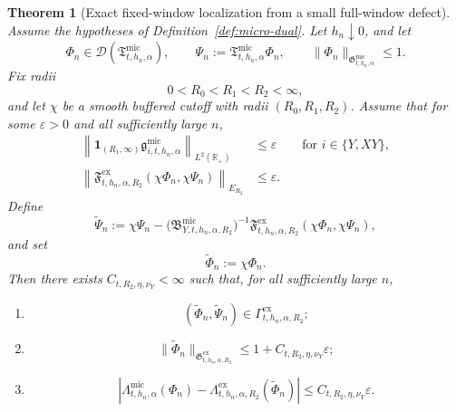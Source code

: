 \documentclass[11pt,a4paper]{amsart}
\theoremstyle{plain}
\newtheorem{theorem}{Theorem}[section]
\theoremstyle{definition}
\theoremstyle{remark}
\newcommand{\R}{\mathbb{R}}
\newcommand{\one}{\mathbf 1}
\begin{document}
\begin{theorem}[Exact fixed-window localization from a small full-window defect]
\label{thm:defect-localization}
Assume the hypotheses of Definition~\ref{def:micro-dual}. Let \(h_n\downarrow0\), and let
\[
\Phi_n\in\mathcal D(\mathfrak T_{t,h_n,\alpha}^{\mathrm{mic}}),
\qquad
\Psi_n:=\mathfrak T_{t,h_n,\alpha}^{\mathrm{mic}}\Phi_n,
\qquad
\|\Phi_n\|_{\mathfrak G_{t,h_n,\alpha}^{\mathrm{mic}}}\le1.
\]
Fix radii
\[
0<R_0<R_1<R_2<\infty,
\]
and let \(\chi\) be a smooth buffered cutoff with radii \((R_0,R_1,R_2)\). Assume that for some
\(\varepsilon>0\) and all sufficiently large \(n\),
\begin{align}
\left\|
\one_{(R_1,\infty)}
\mathfrak g_{i,t,h_n,\alpha}^{\mathrm{mic}}
\right\|_{L^2(\R_+)}
&\le
\varepsilon
\qquad\text{for }i\in\{Y,XY\},
\label{eq:defect-localize-profile}\\
\left\|
\mathfrak F_{t,h_n,\alpha,R_2}^{\mathrm{ex}}(\chi\Phi_n,\chi\Psi_n)
\right\|_{E_{R_2}}
&\le
\varepsilon.
\label{eq:defect-localize-defect}
\end{align}
Define
\begin{equation}\label{eq:defect-localize-corrected}
\widetilde\Psi_n
:=
\chi\Psi_n
-
\bigl(
\mathfrak B_{Y,t,h_n,\alpha,R_2}^{\mathrm{mic}}
\bigr)^{-1}
\mathfrak F_{t,h_n,\alpha,R_2}^{\mathrm{ex}}(\chi\Phi_n,\chi\Psi_n),
\end{equation}
and set
\[
\widetilde\Phi_n:=\chi\Phi_n.
\]
Then there exists \(C_{t,R_2,\eta,\nu_Y}<\infty\) such that, for all sufficiently large \(n\),
\begin{enumerate}[label=(\roman*)]
\item
\[
(\widetilde\Phi_n,\widetilde\Psi_n)\in \Gamma_{t,h_n,\alpha,R_2}^{\mathrm{ex}};
\]
\item
\begin{equation}\label{eq:defect-localize-norm}
\|\widetilde\Phi_n\|_{\mathfrak G_{t,h_n,\alpha,R_2}^{\mathrm{ex}}}
\le
1+C_{t,R_2,\eta,\nu_Y}\varepsilon;
\end{equation}
\item
\begin{equation}\label{eq:defect-localize-functional}
\left|
\Lambda_{t,h_n,\alpha}^{\mathrm{mic}}(\Phi_n)
-
\Lambda_{t,h_n,\alpha,R_2}^{\mathrm{ex}}(\widetilde\Phi_n)
\right|
\le
C_{t,R_2,\eta,\nu_Y}\varepsilon.
\end{equation}
\end{enumerate}
\end{theorem}
\end{document}
